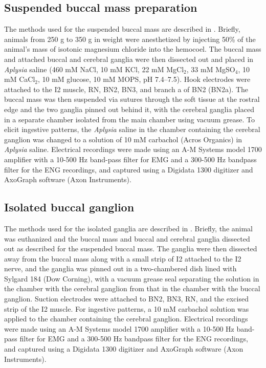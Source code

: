 \subsection{Suspended buccal mass preparation}

The methods used for the suspended buccal mass are described in
\citet{mcmanus_vitro_2012}.  Briefly, animals from 250 g to 350 g in weight
were anesthetized by injecting 50\% of the animal's mass of isotonic magnesium
chloride into the hemocoel.  The buccal mass and attached buccal and
cerebral ganglia were then dissected out and placed in \textit{Aplysia} saline
(460 mM NaCl, 10 mM KCl, 22 mM MgCl${}_2$, 33 mM MgSO${}_4$, 10 mM CaCl${}_2$,
10 mM glucose, 10 mM MOPS, pH 7.4–7.5).  Hook electrodes were attached to the
I2 muscle, RN, BN2, BN3, and branch a of BN2 (BN2a).  The buccal mass was then
suspended via sutures through the soft tissue at the rostral edge and the two
ganglia pinned out behind it, with the cerebral ganglia placed in a separate
chamber isolated from the main chamber using vacuum grease.  To elicit
ingestive patterns, the \textit{Aplysia} saline in the chamber containing the
cerebral ganglion was changed to a solution of 10 mM carbachol (Acros Organics)
in \textit{Aplysia} saline.  Electrical recordings were made using an A-M
Systems model 1700 amplifier with a 10-500 Hz band-pass filter for EMG and a
300-500 Hz bandpass filter for the ENG recordings, and captured using a
Digidata 1300 digitizer and AxoGraph software (Axon Instruments).



\subsection{Isolated buccal ganglion}
The methods used for the isolated ganglia are described in \citet{lu_extracellularly_2013}.
Briefly, the animal was euthanized and
the buccal mass and buccal and cerebral ganglia dissected out as described for
the suspended buccal mass.  The ganglia were then dissected away from the
buccal mass along with a small strip of I2 attached to the I2 nerve, and the
ganglia was pinned out in a two-chambered dish lined with Sylgard 184 (Dow Corning), with a
vacuum grease seal separating the solution in the chamber with the cerebral
ganglion from that in the chamber with the buccal ganglion.  Suction electrodes
were attached to BN2, BN3, RN, and the excised strip
of the I2 muscle.  For ingestive patterns, a 10 mM carbachol solution was
applied to the chamber containing the cerebral ganglion.  Electrical recordings
were made using an A-M Systems model 1700 amplifier with a 10-500 Hz band-pass
filter for EMG and a 300-500 Hz bandpass filter for the ENG recordings, and
captured using a Digidata 1300 digitizer and AxoGraph software (Axon
Instruments).


